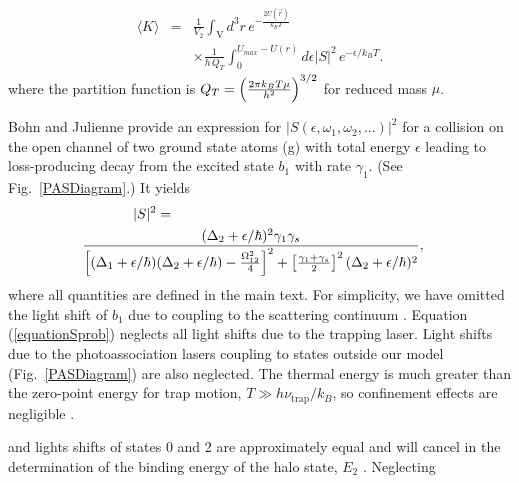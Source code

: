 \begin{eqnarray} \label{equationKeffective}
  \langle K \rangle&=& \frac{1}{V_{2}}\int_{\mathrm{V}}
d^3r \,
          e^{-\frac{2U(\vec{r})}{k_{B}T}} \nonumber \\
         &&\times \frac{1}{h\,Q_{T}}
\int_{0}^{U_{max}-U(r)}d\epsilon \vert S\vert^2
   \,e^{-\epsilon/k_{B}T}.
\end{eqnarray}
where the partition function is $Q_{T}=\left({2\pi k_{B}T \mu \over
h^2}\right) ^{3/2}$ for reduced mass $\mu$.


Bohn and Julienne \cite{bju96} provide an expression for $\vert S(\epsilon,\omega_1,\omega_2,...)\vert^2$ for a collision on the open channel of two ground state atoms (g) with total energy $\epsilon$ leading to loss-producing decay from the excited state $b_1$ with rate $\gamma_1$. (See Fig.\ \ref{PASDiagram}.) It yields
\begin{eqnarray}\label{equationSprob}
  \vert S\vert^2 =   \hspace{2.5in}&&\\
  {(\Delta_2+\epsilon/\hbar)^2{\gamma}_1{\gamma}_s \over
  	\left[(\Delta_1+\epsilon/\hbar)(\Delta_2+\epsilon/\hbar)-\frac{\Omega_{12}^{2}}{4}\right]^2+\left[ \frac{\gamma_1+\gamma_s}{2}\right]^2(\Delta_2+		 	\epsilon/\hbar)^2}, &&\nonumber
\end{eqnarray}
where all quantities are defined in the main text. For simplicity, we have omitted the light shift of $b_1$ due to coupling to the scattering continuum \cite{bju99}. Equation (\ref{equationSprob}) neglects all light shifts due to the trapping laser. Light shifts due to the photoassociation lasers coupling to states outside our model (Fig.\ \ref{PASDiagram}) are also neglected. The thermal energy is much greater than the zero-point energy for trap motion, $T\gg h\nu_{\text{trap}}/k_B$, so confinement effects are negligible \cite{zbl06}.


and lights shifts of states 0 and 2 are approximately equal and will cancel in the determination of the binding energy of the halo state, $E_2$ \cite{rbm04,rfk87}. Neglecting

